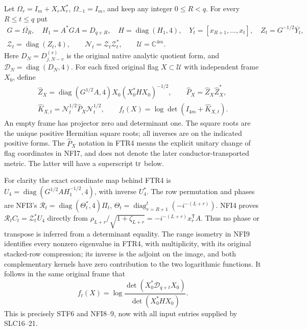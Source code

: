 Let $\Omega_r=I_m+X_rX_r^*$, $\Omega_{-1}=I_m$, and keep any
integer $0\le R<q$. For every $R\le t\le q$ put
\[
\begin{gathered}
 G=\overline{\Omega_R},\quad H_1=A^*GA=D_{q+R},\quad
 H=\operatorname{diag}(H_1,4),\quad
 Y_t=[x_{R+1},\ldots,x_t],\quad Z_t=G^{-1/2}\overline{Y_t},\\
 \mathscr Z_t=\operatorname{diag}(Z_t,4),\qquad
 \mathscr N_t=\mathscr Z_t\mathscr Z_t^*,\qquad
 \mathcal U=\mathbb C^{4m} .                              \tag{FTR3}
\end{gathered}
\]
Here $D_N=D_{j,N-v}^{(s)}$ is the original native analytic quotient
form, and $\mathcal D_N=\operatorname{diag}(D_N,4)$.
For each fixed original flag $X\subset\mathcal U$ with independent
frame $X_0$, define
\[
\begin{gathered}
 \widehat Z_X=\operatorname{diag}(G^{1/2}A,4)
                 X_0(X_0^*HX_0)^{-1/2},\qquad
 \widehat P_X=\widehat Z_X\widehat Z_X^*,\\
 \widehat K_{X,t}=\mathscr N_t^{1/2}\widehat P_X
                                      \mathscr N_t^{1/2},\qquad
 f_t(X)=\log\det(I_{4m}+\widehat K_{X,t}).                 \tag{FTR4}
\end{gathered}
\]
An empty frame has projector zero and determinant one. The square
roots are the unique positive Hermitian square roots; all inverses
are on the indicated positive forms. The $\widehat P_X$ notation
in FTR4 means the explicit unitary change of flag coordinates in
NFI7, and does not denote the later conductor-transported metric.
The latter will have a superscript ${\rm tr}$ below.

For clarity the exact coordinate map behind FTR4 is
$U_4=\operatorname{diag}(G^{1/2}AH_1^{-1/2},4)$, with inverse
$U_4^*$. The row permutation and phases are NFI3's
$\mathscr R_t=\operatorname{diag}(\Theta_t^*,4)\Pi_t$,
$\Theta_t=\operatorname{diag}_{r=R+1}^{t}(-i^{-(L+r)})$.
NFI4 proves $\mathscr R_tC_t=\mathscr Z_t^*U_4$ directly from
$\rho_{L+r}/\sqrt{1+\zeta_{L+r}}=-i^{-(L+r)}x_r^{\mathsf T}A$.
Thus no phase or transpose is inferred from a determinant equality.
The range isometry in NFI9 identifies every nonzero eigenvalue in
FTR4, with multiplicity, with its original stacked-row compression;
its inverse is the adjoint on the image, and both complementary
kernels have zero contribution to the two logarithmic functions.
It follows in the same original frame that
\[
 f_t(X)=\log\frac{\det(X_0^*\mathcal D_{q+t}X_0)}
                              {\det(X_0^*HX_0)} .        \tag{FTR5}
\]
This is precisely STF6 and NFI8--9, now with all input entries
supplied by SLC16--21.

